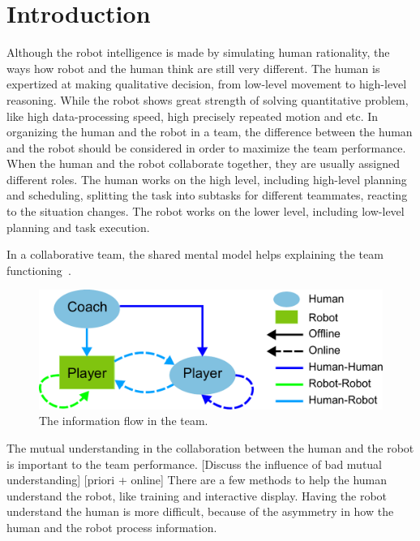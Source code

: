 \documentclass[phd]{byuprop}
\title{\Title}
\author{\Author}
\begin{document}
\maketitle

\section{Introduction}

Although the robot intelligence is made by simulating human rationality, the ways how robot and the human think are still very different.
The human is expertized at making qualitative decision, from low-level movement to high-level reasoning.
While the robot shows great strength of solving quantitative problem, like high data-processing speed, high precisely repeated motion and etc.
In organizing the human and the robot in a team, the difference between the human and the robot should be considered in order to maximize the team performance.
When the human and the robot collaborate together, they are usually assigned different roles.
The human works on the high level, including high-level planning and scheduling, splitting the task into subtasks for different teammates, reacting to the situation changes.  
The robot works on the lower level, including low-level planning and task execution.

In a collaborative team, the shared mental model helps explaining the team functioning~\cite{Jonker:2010:SMM:2018118.2018128}.



\begin{figure}[hbtp]
\centering
\includegraphics[width=0.7\linewidth]{./fig/team_info_flow.pdf}
\caption{The information flow in the team.}
\label{fig:team_info_flow}
\end{figure}


The mutual understanding in the collaboration between the human and the robot is important to the team performance.
[Discuss the influence of bad mutual understanding]
[priori + online]
There are a few methods to help the human understand the robot, like training and interactive display.
Having the robot understand the human is more difficult, because of the asymmetry in how the human and the robot process information.
\end{document}
